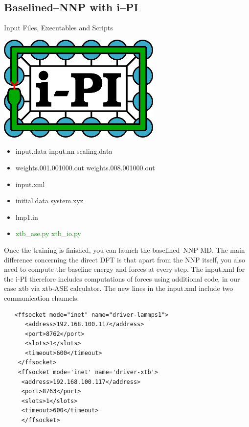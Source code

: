 \documentclass[12pt]{article}
\begin{document}
\subsection{Baselined--NNP with i--PI}
\begin{mybox2}{{Input Files, Executables and Scripts}}
\begin{minipage}[c]{0.5\linewidth}
\includegraphics[scale=0.35]{latex_files/ipi-logo-alpha.png}
\end{minipage}
\begin{minipage}[c]{0.5\linewidth}
\begin{itemize}
    \item input.data input.nn scaling.data
    \item weights.001.001000.out weights.008.001000.out
    \item input.xml
    \item initial.data system.xyz
    \item lmp1.in
    \item \textcolor{green}{xtb\_ase.py xtb\_io.py}
\end{itemize}
\end{minipage}
\end{mybox2}

Once the training is finished, you can launch the baselined--NNP MD. The main difference concerning the direct DFT is that apart from the NNP itself, you also need to compute the baseline energy and forces at every step. The input.xml for the i-PI therefore includes computations of forces using additional code, in our case xtb via xtb-ASE calculator. The new lines in the input.xml include two communication channels:

\begin{verbatim}
   <ffsocket mode="inet" name="driver-lammps1">
      <address>192.168.100.117</address>
      <port>8762</port>
      <slots>1</slots>
      <timeout>600</timeout>
    </ffsocket>
    <ffsocket mode='inet' name='driver-xtb'>
     <address>192.168.100.117</address>
     <port>8763</port>
     <slots>1</slots>
     <timeout>600</timeout>
     </ffsocket>

\end{verbatim}
\end{document}
